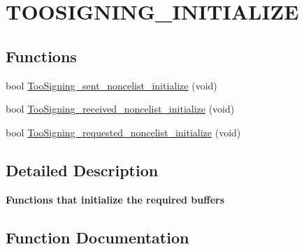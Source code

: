 \hypertarget{group__TOOSIGNING__INITIALIZE}{}\section{T\+O\+O\+S\+I\+G\+N\+I\+N\+G\+\_\+\+I\+N\+I\+T\+I\+A\+L\+I\+ZE}
\label{group__TOOSIGNING__INITIALIZE}
\subsection*{Functions}
\begin{DoxyCompactItemize}
\item 
bool \hyperlink{group__TOOSIGNING__INITIALIZE_ga0ad0c6af4c20b80f75ccf3d4a2804a0c}{Too\+Signing\+\_\+sent\+\_\+noncelist\+\_\+initialize} (void)
\item 
bool \hyperlink{group__TOOSIGNING__INITIALIZE_ga24011c99b90b9070adb424cee01a3fc2}{Too\+Signing\+\_\+received\+\_\+noncelist\+\_\+initialize} (void)
\item 
bool \hyperlink{group__TOOSIGNING__INITIALIZE_gafd247c5271ff63bfcde14ef94060002d}{Too\+Signing\+\_\+requested\+\_\+noncelist\+\_\+initialize} (void)
\end{DoxyCompactItemize}


\subsection{Detailed Description}
{\bfseries Functions that initialize the required buffers} 

\subsection{Function Documentation}
